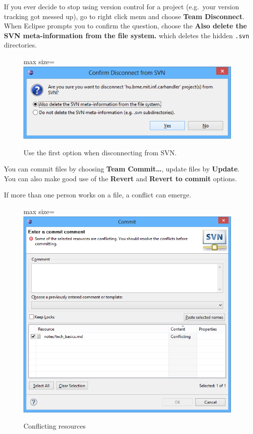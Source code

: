 \documentclass[]{report}
\let\Oldincludegraphics\includegraphics
\renewcommand{\includegraphics}[1]{
\begin{adjustbox}{max size={\textwidth}{\textheight}}
    \Oldincludegraphics[scale=0.6]{#1}%
\end{adjustbox}
}
\begin{document}
If you ever decide to stop using version control for a project
(e.g.~your version tracking got messed up), go to right click menu and
choose \textbf{Team \textbar{} Disconnect}. When Eclipse prompts you to
confirm the question, choose the \textbf{Also delete the SVN
meta-information from the file system.} which deletes the hidden
\texttt{.svn} directories.

\begin{figure}[htbp]
\centering
\includegraphics{img/eclipse_basics/svn_disconnect.png}
\caption{Use the first option when disconnecting from SVN.}
\end{figure}

You can commit files by choosing \textbf{Team \textbar{}
Commit\ldots{}}, update files by \textbf{Update}. You can also make good
use of the \textbf{Revert} and \textbf{Revert to commit} options.

If more than one person works on a file, a conflict can emerge.

\begin{figure}[htbp]
\centering
\includegraphics{img/eclipse_basics/svn_commit_conflict.png}
\caption{Conflicting resources}
\end{figure}
\end{document}
